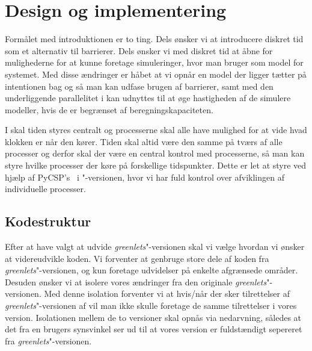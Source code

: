 
\section{Design og implementering}
\begin{shaded}
Formålet med introduktionen er to ting. Dels ønsker vi at introducere diskret tid som et alternativ til barrierer. Dels ønsker vi med diskret tid at åbne for mulighederne for at kunne foretage simuleringer, hvor man bruger \csp som model for systemet. Med disse ændringer er håbet at vi opnår en model der ligger tætter på intentionen bag \csp og så man kan udfase brugen af barrierer, samt med den underliggende parallelitet i \csp kan udnyttes til at øge hastigheden af de simulere modeller, hvis de er begrænset af beregningskapaciteten.

I \des  skal tiden styres centralt og processerne skal alle have mulighed for at vide hvad klokken er når den kører. Tiden skal altid være den samme på tværs af alle processer og derfor skal der være en central kontrol med processerne, så man kan styre hvilke processer der køre på forskellige tidspunkter. Dette er let at styre ved hjælp af PyCSP's \sched ~i "-versionen, hvor vi har fuld kontrol over afviklingen af individuelle processer. 
\end{shaded}

\subsection{Kodestruktur}  
Efter at have valgt at udvide \emph{greenlets}"-versionen skal vi vælge hvordan vi ønsker at videreudvikle koden. Vi forventer at genbruge store dele af koden fra \emph{greenlets}"-versionen, og kun foretage udvidelser på enkelte afgrænsede områder. Desuden ønsker vi at isolere vores ændringer fra den originale \emph{greenlets}"-versionen. Med denne isolation forventer vi at hvis/når der sker tilrettelser af \emph{greenlets}"-versionen af \pycsp vil man ikke skulle foretage de samme tilrettelser i vores version. 
Isolationen mellem de to versioner skal opnås via nedarvning, således at det fra en brugers synsvinkel ser ud til at vores version er fuldstændigt sepereret fra \emph{greenlets}"-versionen.

